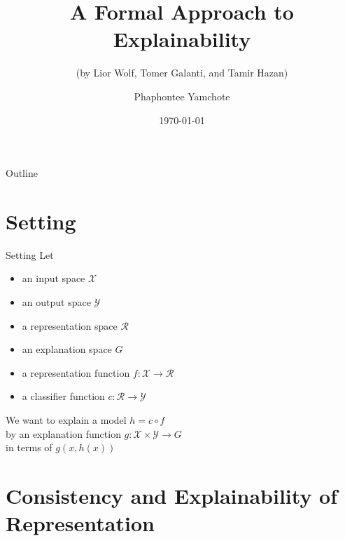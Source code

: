 \documentclass[10pt, aspectratio=169]{beamer}
\title{A Formal Approach to Explainability}
\subtitle{(by Lior Wolf, Tomer Galanti, and Tamir Hazan)}
\date{\today}
\author{Phaphontee Yamchote}
\begin{document}
	\begin{frame}[plain]
		\maketitle
	\end{frame}
	\begin{frame}{Outline}
		\tableofcontents
	\end{frame}
	\section{Setting}
	\begin{frame}{Setting}
		Let 
		\begin{itemize}
			\item an input space $\mathcal{X}$
			\item an output space $\mathcal{Y}$ 
			\item a representation space $\mathcal{R}$
			\item an explanation space $G$
			\item a representation function $f:\mathcal{X}\to\mathcal{R}$
			\item a classifier function $c:\mathcal{R}\to\mathcal{Y}$
		\end{itemize}
		
		We want to explain a model $h = c\circ f$\\
		by an explanation function $g:\mathcal{X}\times\mathcal{Y}\to G$\\
		in terms of $g(x,h(x))$
	\end{frame}
	
	\section{Consistency and Explainability of Representation}
	
\end{document}
